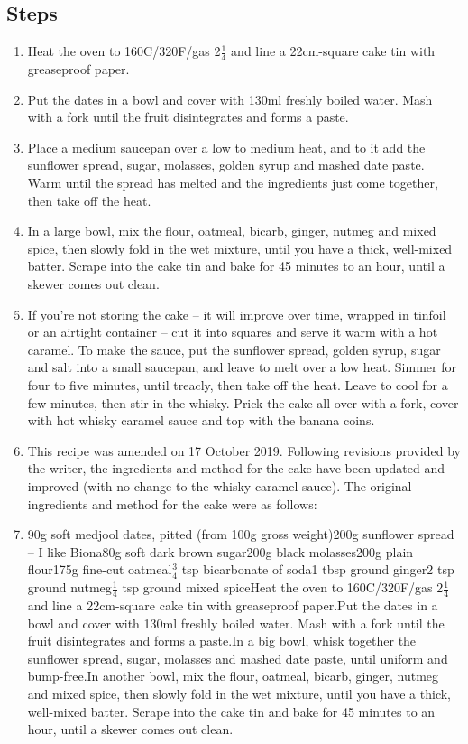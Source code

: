 \documentclass{book}
\begin{document}
\subsection*{Steps}
\begin{enumerate}
\item Heat the oven to 160C/320F/gas 2$\frac{1}{4}$ and line a 22cm-square cake tin with greaseproof paper.
\item Put the dates in a bowl and cover with 130ml freshly boiled water. Mash with a fork until the fruit disintegrates and forms a paste.
\item Place a medium saucepan over a low to medium heat, and to it add the sunflower spread, sugar, molasses, golden syrup and mashed date paste. Warm until the spread has melted and the ingredients just come together, then take off the heat.
\item In a large bowl, mix the flour, oatmeal, bicarb, ginger, nutmeg and mixed spice, then slowly fold in the wet mixture, until you have a thick, well-mixed batter. Scrape into the cake tin and bake for 45 minutes to an hour, until a skewer comes out clean.
\item If you’re not storing the cake – it will improve over time, wrapped in tinfoil or an airtight container – cut it into squares and serve it warm with a hot caramel. To make the sauce, put the sunflower spread, golden syrup, sugar and salt into a small saucepan, and leave to melt over a low heat. Simmer for four to five minutes, until treacly, then take off the heat. Leave to cool for a few minutes, then stir in the whisky. Prick the cake all over with a fork, cover with hot whisky caramel sauce and top with the banana coins.
\item  This recipe was amended on 17 October 2019. Following revisions provided by the writer, the ingredients and method for the cake have been updated and improved (with no change to the whisky caramel sauce). The original ingredients and method for the cake were as follows:
\item 90g soft medjool dates, pitted (from 100g gross weight)200g sunflower spread – I like Biona80g soft dark brown sugar200g black molasses200g plain flour175g fine-cut oatmeal$\frac{3}{4}$ tsp bicarbonate of soda1 tbsp ground ginger2 tsp ground nutmeg$\frac{1}{4}$ tsp ground mixed spiceHeat the oven to 160C/320F/gas 2$\frac{1}{4}$ and line a 22cm-square cake tin with greaseproof paper.Put the dates in a bowl and cover with 130ml freshly boiled water. Mash with a fork until the fruit disintegrates and forms a paste.In a big bowl, whisk together the sunflower spread, sugar, molasses and mashed date paste, until uniform and bump-free.In another bowl, mix the flour, oatmeal, bicarb, ginger, nutmeg and mixed spice, then slowly fold in the wet mixture, until you have a thick, well-mixed batter. Scrape into the cake tin and bake for 45 minutes to an hour, until a skewer comes out clean.
\end{enumerate}
\newpage
\end{document}
